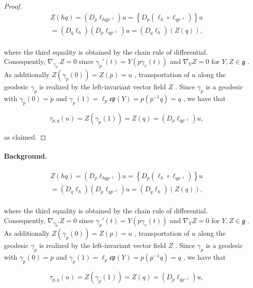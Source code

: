 \documentclass[11pt]{article}
\begin{document}
\begin{proof}
$$
\begin{array}{l} Z (h q) = \left(D _ {p} \ell_ {h q p ^ {- 1}}\right) u = \left\{D _ {p} \left(\ell_ {h} \circ \ell_ {q p ^ {- 1}}\right) \right\} u \\ = \left(D _ {q} \ell_ {h}\right) \left(D _ {p} \ell_ {q p ^ {- 1}}\right) u = \left(D _ {q} \ell_ {h}\right) (Z (q)), \\ \end{array}
$$

where the third equality is obtained by the chain rule of differential. Consequently,  $\nabla_{\gamma_p'}Z = 0$  since  $\gamma_p'(t) = Y(p\gamma_e(t))$  and  $\nabla_Y Z = 0$  for  $Y,Z\in \mathfrak{g}$ . As additionally  $Z(\gamma_p(0)) = Z(p) = u$ , transportation of  $u$  along the geodesic  $\gamma_{p}$  is realized by the left-invariant vector field  $Z$ . Since  $\gamma_{p}$  is a geodesic with  $\gamma_p(0) = p$  and  $\gamma_p(1) = \ell_p\mathfrak{e}\mathfrak{p}(Y) = p(p^{-1}q) = q$ , we have that

$$
\tau_ {p, q} (u) = Z \left(\gamma_ {p} (1)\right) = Z (q) = \left(D _ {p} \ell_ {q p ^ {- 1}}\right) u,
$$

as claimed.

\end{proof}

\paragraph{Background.}
$$
\begin{array}{l} Z (h q) = \left(D _ {p} \ell_ {h q p ^ {- 1}}\right) u = \left\{D _ {p} \left(\ell_ {h} \circ \ell_ {q p ^ {- 1}}\right) \right\} u \\ = \left(D _ {q} \ell_ {h}\right) \left(D _ {p} \ell_ {q p ^ {- 1}}\right) u = \left(D _ {q} \ell_ {h}\right) (Z (q)), \\ \end{array}
$$

where the third equality is obtained by the chain rule of differential. Consequently,  $\nabla_{\gamma_p'}Z = 0$  since  $\gamma_p'(t) = Y(p\gamma_e(t))$  and  $\nabla_Y Z = 0$  for  $Y,Z\in \mathfrak{g}$ . As additionally  $Z(\gamma_p(0)) = Z(p) = u$ , transportation of  $u$  along the geodesic  $\gamma_{p}$  is realized by the left-invariant vector field  $Z$ . Since  $\gamma_{p}$  is a geodesic with  $\gamma_p(0) = p$  and  $\gamma_p(1) = \ell_p\mathfrak{e}\mathfrak{p}(Y) = p(p^{-1}q) = q$ , we have that

$$
\tau_ {p, q} (u) = Z \left(\gamma_ {p} (1)\right) = Z (q) = \left(D _ {p} \ell_ {q p ^ {- 1}}\right) u,
$$
\end{document}

